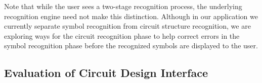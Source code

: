 \documentclass{elsart}
\begin{document}
Note that while the user sees a two-stage recognition process, the
underlying recognition engine need not make this distinction.
Although in our application we currently separate symbol recognition
from circuit structure recognition, we are exploring ways for the
circuit recognition phase to help correct errors in the symbol
recognition phase before the recognized symbols are displayed to the
user.  





\subsection{Evaluation of Circuit Design Interface}
\end{document}
